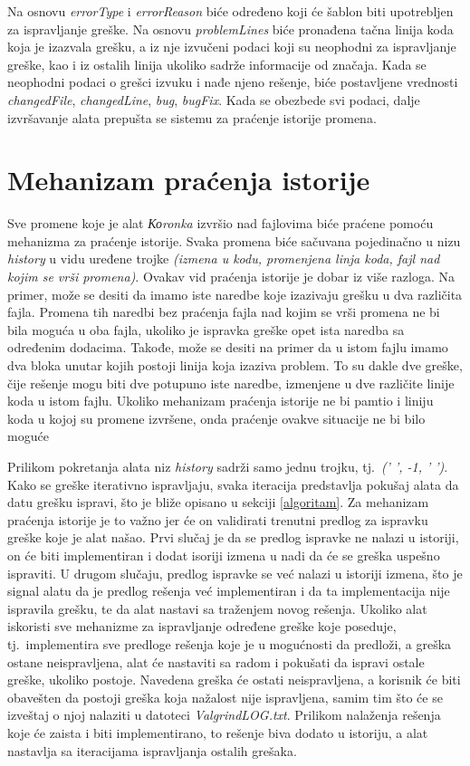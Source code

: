 \documentclass[12pt,oneside]{memoir}
\theoremstyle{plain}
\theoremstyle{definition}
\begin{document}
Na osnovu \textit{errorType} i \textit{errorReason} biće određeno koji će šablon biti upotrebljen za ispravljanje greške. Na osnovu \textit{problemLines} biće pronađena tačna linija koda koja je izazvala grešku, a iz nje izvučeni podaci koji su neophodni za ispravljanje greške, kao i iz ostalih linija ukoliko sadrže informacije od značaja. Kada se neophodni podaci o grešci izvuku i nađe njeno rešenje, biće postavljene vrednosti \textit{changedFile}, \textit{changedLine}, \textit{bug}, \textit{bugFix}. Kada se obezbede svi podaci, dalje izvršavanje alata prepušta se sistemu za praćenje istorije promena.

\section{Mehanizam praćenja istorije}\label{istorija}
Sve promene koje je alat \textit{Коronka} izvršio nad fajlovima biće praćene pomoću mehanizma za praćenje istorije. Svaka promena biće sačuvana pojedinačno u nizu \textit{history} u vidu uređene trojke \textit{(izmena u kodu, promenjena linja koda, fajl nad kojim se vrši promena)}. Ovakav vid praćenja istorije je dobar iz više razloga. Na primer, može se desiti da imamo iste naredbe koje izazivaju grešku u dva različita fajla. Promena tih naredbi bez praćenja fajla nad kojim se vrši promena ne bi bila moguća u oba fajla, ukoliko je ispravka greške opet ista naredba sa određenim dodacima. Takođe, može se desiti na primer da u istom fajlu imamo dva bloka unutar kojih postoji linija koja izaziva problem. To su dakle dve greške, čije rešenje mogu biti dve potupuno iste naredbe, izmenjene u dve različite linije koda u istom fajlu. Ukoliko mehanizam praćenja istorije ne bi pamtio i liniju koda u kojoj su promene izvršene, onda praćenje ovakve situacije ne bi bilo moguće 

Prilikom pokretanja alata niz \textit{history} sadrži samo jednu trojku, tj.~\textit{(' ', -1, ' ')}. Kako se greške iterativno ispravljaju, svaka iteracija predstavlja pokušaj alata da datu grešku ispravi, što je bliže opisano u sekciji \ref{algoritam}. Za mehanizam praćenja istorije je to važno jer će on validirati trenutni predlog za ispravku greške koje je alat našao. Prvi slučaj je da se predlog ispravke ne nalazi u istoriji, on će biti implementiran i dodat isoriji izmena u nadi da će se greška uspešno ispraviti. U drugom slučaju, predlog ispravke se već nalazi u istoriji izmena, što je signal alatu da je predlog rešenja već implementiran i da ta implementacija nije ispravila grešku, te da alat nastavi sa traženjem novog rešenja. Ukoliko alat iskoristi sve mehanizme za ispravljanje određene greške koje poseduje, tj.~implementira sve predloge rešenja koje je u mogućnosti da predloži, a greška ostane neispravljena, alat će nastaviti sa radom i pokušati da ispravi ostale greške, ukoliko postoje. Navedena greška će ostati neispravljena, a korisnik će biti obavešten da postoji greška koja nažalost nije ispravljena, samim tim što će se izveštaj o njoj nalaziti u datoteci \textit{ValgrindLOG.txt}. Prilikom nalaženja rešenja koje će zaista i biti implementirano, to rešenje biva dodato u istoriju, a alat nastavlja sa iteracijama ispravljanja ostalih grešaka.
\end{document}
